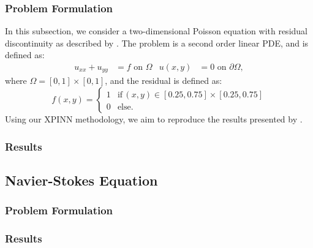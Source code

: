 \subsubsection{Problem Formulation}
In this subsection, we consider a two-dimensional Poisson equation with residual discontinuity as described by \cite{XPINN_generalize}.
The problem is a second order linear PDE, and is defined as:
\begin{align}\label{eq:poisson}
    u_{xx}+u_{yy} &= f \text{ on } \Omega &
    u(x,y) &= 0 \text{ on } \partial\Omega,
\end{align}
where $\Omega = [0,1] \times [0,1]$, and the residual is defined as:
\begin{equation*}
    f(x,y)=
    \begin{cases}
        1 &\text{if} \, (x,y)\in [0.25,0.75]\times[0.25,0.75] \\
        0 &\text{else}.
    \end{cases}
\end{equation*}
Using our XPINN methodology, we aim to reproduce the results presented by \cite{XPINN_generalize}.
\subsubsection{Results}

\subsection{Navier-Stokes Equation}
\subsubsection{Problem Formulation}
\subsubsection{Results}
